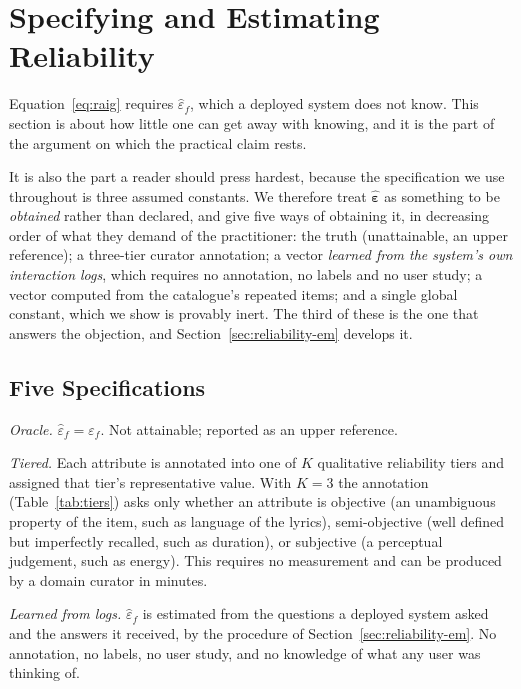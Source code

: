 \section{Specifying and Estimating Reliability}
\label{sec:reliability}

Equation~\eqref{eq:raig} requires $\hat\varepsilon_f$, which a deployed system
does not know. This section is about how little one can get away with knowing,
and it is the part of the argument on which the practical claim rests.

It is also the part a reader should press hardest, because the specification we
use throughout is three assumed constants. We therefore treat
$\hat{\boldsymbol\varepsilon}$ as something to be \emph{obtained} rather than
declared, and give five ways of obtaining it, in decreasing order of what they
demand of the practitioner: the truth (unattainable, an upper reference); a
three-tier curator annotation; a vector \emph{learned from the system's own
interaction logs}, which requires no annotation, no labels and no user study; a
vector computed from the catalogue's repeated items; and a single global
constant, which we show is provably inert. The third of these is the one that
answers the objection, and Section~\ref{sec:reliability-em} develops it.

\subsection{Five Specifications}
\label{sec:tiers}

\emph{Oracle.} $\hat\varepsilon_f = \varepsilon_f$. Not attainable; reported as
an upper reference.

\emph{Tiered.} Each attribute is annotated into one of $K$ qualitative
reliability tiers and assigned that tier's representative value. With $K=3$ the
annotation (Table~\ref{tab:tiers}) asks only whether an attribute is objective
(an unambiguous property
of the item, such as language of the lyrics), semi-objective (well defined but
imperfectly recalled, such as duration), or subjective (a perceptual judgement,
such as energy). This requires no measurement and can be produced by a domain
curator in minutes.

\emph{Learned from logs.} $\hat\varepsilon_f$ is estimated from the questions a
deployed system asked and the answers it received, by the procedure of
Section~\ref{sec:reliability-em}. No annotation, no labels, no user study, and
no knowledge of what any user was thinking of.

